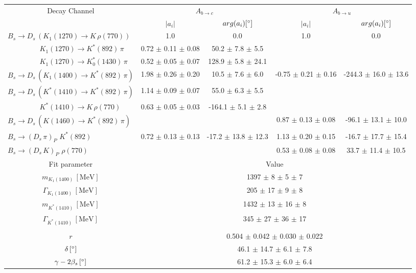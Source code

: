\begin{tabular}{l c c c c } 
\hline
\hline
\multicolumn{1}{c}{Decay Channel} & \multicolumn{2}{c}{$A_{b \to c}$} & \multicolumn{2}{c}{$A_{b \to u}$}  \\ 
 & \multicolumn{1}{c}{$\vert a_i \vert$}  & \multicolumn{1}{c}{$arg(a_i) [^{\circ}]$}  & \multicolumn{1}{c}{$\vert a_i \vert$} & \multicolumn{1}{c}{$arg(a_i) [^{\circ}]$} \\ 
\hline
 $B_s \to D_s \, ( K_1(1270) \to K \, \rho(770) ) $ &  1.0 & 0.0 & 1.0 & 0.0  \\ 
$\phantom{B_s \to D_s \, (} K_1(1270) \to K^{*}(892) \, \pi \phantom{)} $ & 0.72 $\pm$ 0.11 $\pm$ 0.08 & 50.2 $\pm$ 7.8 $\pm$ 5.5 & &   \\ 
$\phantom{B_s \to D_s \, (} K_1(1270) \to K^{*}_{0}(1430) \, \pi \phantom{)} $ & 0.52 $\pm$ 0.05 $\pm$ 0.07 & 128.9 $\pm$ 5.8 $\pm$ 24.1 & &   \\ 
$B_s \to D_s \, ( K_1(1400) \to K^{*}(892) \, \pi ) $ & 1.98 $\pm$ 0.26 $\pm$ 0.20 & 10.5 $\pm$ 7.6 $\pm$ 6.0 & -0.75 $\pm$ 0.21 $\pm$ 0.16 & -244.3 $\pm$ 16.0 $\pm$ 13.6 \\ 
$B_s \to D_s \, ( K^{*}(1410) \to K^{*}(892) \, \pi ) $ & 1.14 $\pm$ 0.09 $\pm$ 0.07 & 55.0 $\pm$ 6.3 $\pm$ 5.5 &  &  \\ 
$\phantom{B_s \to D_s \, (} K^{*}(1410) \to K \, \rho(770) \phantom{)} $ & 0.63 $\pm$ 0.05 $\pm$ 0.03 & -164.1 $\pm$ 5.1 $\pm$ 2.8 & &   \\ 
$B_s \to D_s \, ( K(1460) \to K^{*}(892) \, \pi ) $ & & &0.87 $\pm$ 0.13 $\pm$ 0.08 & -96.1 $\pm$ 13.1 $\pm$ 10.0 \\ 
$B_s \to ( D_s \, \pi)_{P} \, \, K^{*}(892) $ & 0.72 $\pm$ 0.13 $\pm$ 0.13 & -17.2 $\pm$ 13.8 $\pm$ 12.3 & 1.13 $\pm$ 0.20 $\pm$ 0.15 & -16.7 $\pm$ 17.7 $\pm$ 15.4 \\ 
$B_s \to ( D_s \, K)_{P} \, \, \rho(770) $ & & &0.53 $\pm$ 0.08 $\pm$ 0.08 & 33.7 $\pm$ 11.4 $\pm$ 10.5 \\ 
\hline
\hline
\multicolumn{1}{c}{Fit parameter} & \multicolumn{4}{c}{Value}  \\ 
\hline
\multicolumn{1}{c}{$m_{K_1(1400)} \, [\text{MeV}]$} & \multicolumn{4}{c}{1397 $\pm$ 8 $\pm$ 5 $\pm$ 7} \\ 
\multicolumn{1}{c}{$\Gamma_{K_1(1400)} \, [\text{MeV}]$} & \multicolumn{4}{c}{205 $\pm$ 17 $\pm$ 9 $\pm$ 8} \\ 
\multicolumn{1}{c}{$m_{K^{*}(1410)} \, [\text{MeV}]$} & \multicolumn{4}{c}{1432 $\pm$ 13 $\pm$ 16 $\pm$ 8} \\ 
\multicolumn{1}{c}{$\Gamma_{K^{*}(1410)} \, [\text{MeV}]$} & \multicolumn{4}{c}{345 $\pm$ 27 $\pm$ 36 $\pm$ 17} \\ 
 \\ 
\multicolumn{1}{c}{$r$} & \multicolumn{4}{c}{0.504 $\pm$ 0.042 $\pm$ 0.030 $\pm$ 0.022} \\ 
\multicolumn{1}{c}{$\delta \, [^{\circ}]$} & \multicolumn{4}{c}{46.1 $\pm$ 14.7 $\pm$ 6.1 $\pm$ 7.8} \\ 
\multicolumn{1}{c}{$\gamma - 2 \beta_{s} \, [^{\circ}]$} & \multicolumn{4}{c}{61.2 $\pm$ 15.3 $\pm$ 6.0 $\pm$ 6.4} \\ 
\hline
\hline
\end{tabular}
